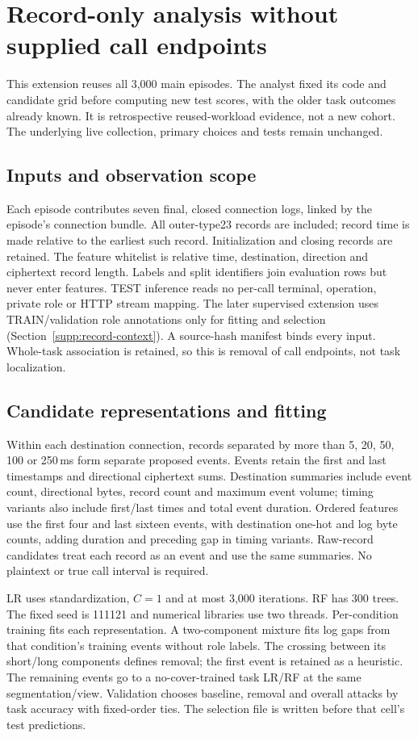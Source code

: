 \section{Record-only analysis without supplied call endpoints}\label{supp:no-call}
This extension reuses all 3,000 main episodes. The analyst fixed its code and candidate grid before computing new test scores, with the older task outcomes already known. It is retrospective reused-workload evidence, not a new cohort. The underlying live collection, primary choices and tests remain unchanged.

\subsection{Inputs and observation scope}
Each episode contributes seven final, closed connection logs, linked by the episode's connection bundle. All outer-type23 records are included; record time is made relative to the earliest such record. Initialization and closing records are retained. The feature whitelist is relative time, destination, direction and ciphertext record length. Labels and split identifiers join evaluation rows but never enter features. TEST inference reads no per-call terminal, operation, private role or HTTP stream mapping. The later supervised extension uses TRAIN/validation role annotations only for fitting and selection (Section~\ref{supp:record-context}). A source-hash manifest binds every input. Whole-task association is retained, so this is removal of call endpoints, not task localization.

\subsection{Candidate representations and fitting}
Within each destination connection, records separated by more than 5, 20, 50, 100 or 250\,ms form separate proposed events. Events retain the first and last timestamps and directional ciphertext sums. Destination summaries include event count, directional bytes, record count and maximum event volume; timing variants also include first/last times and total event duration. Ordered features use the first four and last sixteen events, with destination one-hot and log byte counts, adding duration and preceding gap in timing variants. Raw-record candidates treat each record as an event and use the same summaries. No plaintext or true call interval is required.

LR uses standardization, $C=1$ and at most 3,000 iterations. RF has 300 trees. The fixed seed is 111121 and numerical libraries use two threads. Per-condition training fits each representation. A two-component mixture fits log gaps from that condition's training events without role labels. The crossing between its short/long components defines removal; the first event is retained as a heuristic. The remaining events go to a no-cover-trained task LR/RF at the same segmentation/view. Validation chooses baseline, removal and overall attacks by task accuracy with fixed-order ties. The selection file is written before that cell's test predictions.

